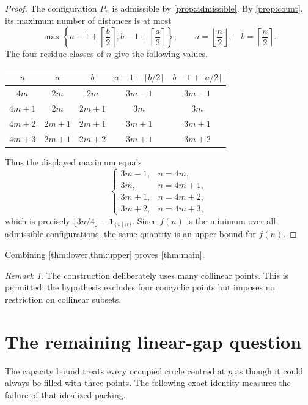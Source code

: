 \documentclass[11pt]{article}
\theoremstyle{definition}
\theoremstyle{remark}
\newtheorem{remark}[remark]{Remark}
\newcommand{\ind}{\mathbf{1}}
\begin{document}
\begin{proof}
The configuration $P_n$ is admissible by \cref{prop:admissible}.  By \cref{prop:count}, its maximum number of distances is at most
\[
 \max\left\{
 a-1+\left\lceil\frac b2\right\rceil,
 b-1+\left\lceil\frac a2\right\rceil
 \right\},
 \qquad
 a=\left\lfloor\frac n2\right\rfloor,
 \quad
 b=\left\lceil\frac n2\right\rceil.
\]
The four residue classes of $n$ give the following values.
\begin{center}
\begin{tabular}{c@{\qquad}c@{\qquad}c@{\qquad}c@{\qquad}c}
\toprule
$n$ & $a$ & $b$
& $a-1+\lceil b/2\rceil$
& $b-1+\lceil a/2\rceil$\\
\midrule
$4m$   & $2m$   & $2m$   & $3m-1$ & $3m-1$\\
$4m+1$ & $2m$   & $2m+1$ & $3m$   & $3m$\\
$4m+2$ & $2m+1$ & $2m+1$ & $3m+1$ & $3m+1$\\
$4m+3$ & $2m+1$ & $2m+2$ & $3m+1$ & $3m+2$\\
\bottomrule
\end{tabular}
\end{center}
Thus the displayed maximum equals
\[
 \begin{cases}
 3m-1,&n=4m,\\
 3m,&n=4m+1,\\
 3m+1,&n=4m+2,\\
 3m+2,&n=4m+3,
 \end{cases}
\]
which is precisely $\lfloor3n/4\rfloor-\ind_{\{4\mid n\}}$.  Since $f(n)$ is the minimum over all admissible configurations, the same quantity is an upper bound for $f(n)$.
\end{proof}

Combining \cref{thm:lower,thm:upper} proves \cref{thm:main}.

\begin{remark}
The construction deliberately uses many collinear points.  This is permitted: the hypothesis excludes four concyclic points but imposes no restriction on collinear subsets.
\end{remark}

\section{The remaining linear-gap question}\label{sec:gap}

The capacity bound treats every occupied circle centred at $p$ as though it could always be filled with three points.  The following exact identity measures the failure of that idealized packing.
\end{document}
